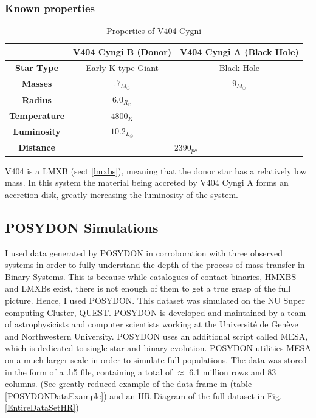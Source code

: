 \documentclass[12pt, a4paper]{article}
\begin{document}
        \subsubsection{Known properties}
        \begin{table}
            \begin{center} 
                \begin{tabular}{||c | c c||} 
                 \hline
                 & \textbf{V404 Cyngi B (Donor)} & \textbf{V404 Cyngi A (Black Hole)} \\ 
                 \hline\hline
                 \textbf{Star Type} & Early K-type Giant & Black Hole \\ 
                 \hline
                 \textbf{Masses}& $.7_{M_\odot}$ \cite{Bernardini_2016} & $9_{M_\odot}$ \cite{Shahbaz_1994} \\
                 \hline
                 \textbf{Radius} & $6.0_{R_\odot}$ \cite{Shahbaz_1994} &  \\
                 \hline
                 \textbf{Temperature} & $4800_K$ \cite{Shahbaz_1994} & \\
                 \hline
                 \textbf{Luminosity} & $10.2_{L_\odot}$ \cite{Shahbaz_1994} &  \\ 
                 \hline
                 \textbf{Distance} & \multicolumn{2}{c||}{$2390_{pc}$ \cite{Bernardini_2016}} \\
                 \hline
            \end{tabular}
            \caption{Properties of V404 Cygni} 
            \label{V404Data} 
            \end{center}
        \end{table}

        V404 is a LMXB (sect \ref{lmxbs}), meaning that the donor star has a relatively low mass. In this system the material being accreted by V404 Cyngi A forms an accretion disk, greatly increasing the luminosity of the system.

    \subsection{POSYDON Simulations}
         I used data generated by POSYDON \cite{Fragos_2023} in corroboration with three observed systems in order to fully understand the depth of the process of mass transfer in Binary Systems. This is because while catalogues of contact binaries, HMXBS and LMXBs exist, there is not enough of them to get a true grasp of the full picture. Hence, I used POSYDON. This dataset was simulated on the NU Super computing Cluster, QUEST. POSYDON is developed and maintained by a team of astrophysicists and computer scientists working at the Université de Genève and Northwestern University. POSYDON uses an additional script called MESA, which is dedicated to single star and binary evolution. POSYDON utilities MESA on a much larger scale in order to simulate full populations. The data was stored in the form of a .h5 file, containing a total of $\approx$ 6.1 million rows and 83 columns. (See greatly reduced example of the data frame in (table \ref{POSYDONDataExample}) and an HR Diagram of the full dataset in Fig. \ref{EntireDataSetHR})
\end{document}

